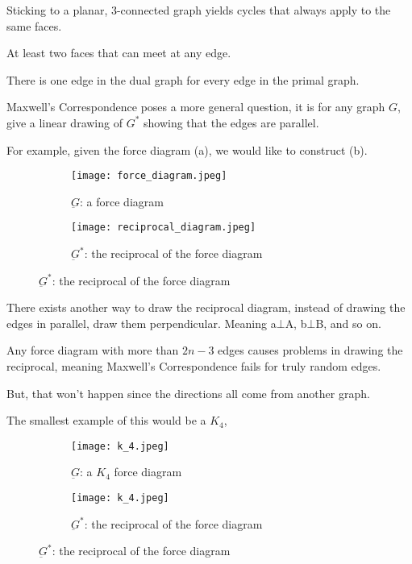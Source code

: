 \documentclass{article}
\begin{document}
    \begin{remark}[]
        Sticking to a planar, 3-connected graph yields cycles that always apply to the same faces.
    \end{remark}
    
    \begin{remark}[]
        At least two faces that can meet at any edge.
    \end{remark}
    
    \begin{remark}
        There is one edge in the dual graph for every edge in the primal graph.
    \end{remark}
    
    Maxwell's Correspondence poses a more general question, it is for any graph $G$, give a linear drawing of $G^*$ showing that the edges are parallel.
    
    For example, given the force diagram (a), we would like to construct (b).
    
    \begin{figure}[H]
    \centering
        \begin{subfigure}{.4\textwidth}
            \centering
            \texttt{[image: force\_diagram.jpeg]}
            \caption{$\underbar{G}$: a force diagram}
        \end{subfigure}%
        \begin{subfigure}{.4\textwidth}
            \centering
            \texttt{[image: reciprocal\_diagram.jpeg]}
            \caption{$\underbar{G}^*$: the reciprocal of the force diagram}
        \end{subfigure}
    \end{figure}
    
    There exists another way to draw the reciprocal diagram, instead of drawing the edges in parallel, draw them perpendicular. Meaning a$\bot$A, b$\bot$B, and so on.
    
    \begin{remark}
        Any force diagram with more than $2n-3$ edges causes problems in drawing the reciprocal, meaning Maxwell's Correspondence fails for truly random edges.
        
        But, that won't happen since the directions all come from another graph.
    \end{remark}
    
    
    The smallest example of this would be a $K_4$,
    
    \begin{figure}[H]
    \centering
        \begin{subfigure}{.4\textwidth}
            \centering
            \texttt{[image: k\_4.jpeg]}
            \caption{$\underbar{G}$: a $K_4$ force diagram}
        \end{subfigure}%
        \begin{subfigure}{.4\textwidth}
            \centering
            \texttt{[image: k\_4.jpeg]}
            \caption{$\underbar{G}^*$: the reciprocal of the force diagram}
        \end{subfigure}
    \end{figure}
    
\end{document}
